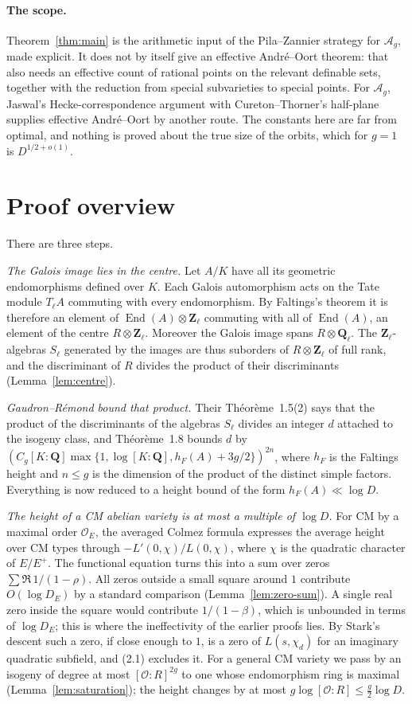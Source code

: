 \documentclass[11pt,a4paper]{article}
\theoremstyle{plain}
\theoremstyle{remark}
\newcommand{\Q}{\mathbf Q}
\newcommand{\Z}{\mathbf Z}
\newcommand{\Ag}{\mathcal A_g}
\newcommand{\OO}{\mathcal O}
\newcommand{\End}{\operatorname{End}}
\begin{document}
\paragraph{The scope.}
Theorem~\ref{thm:main} is the arithmetic input of the Pila--Zannier strategy for $\Ag$, made explicit. It does not
by itself give an effective Andr\'e--Oort theorem: that also needs an effective count of rational points on the
relevant definable sets, together with the reduction from special subvarieties to special points. For $\Ag$, Jaswal's
Hecke-correspondence argument with Cureton--Thorner's half-plane supplies effective Andr\'e--Oort by another route.
The constants here are far from optimal, and nothing is proved about the true size of the orbits, which for $g=1$ is
$D^{1/2+o(1)}$.

\section{Proof overview}

There are three steps.

\emph{The Galois image lies in the centre.} Let $A/K$ have all its geometric endomorphisms defined over $K$. Each
Galois automorphism acts on the Tate module $T_\ell A$ commuting with every endomorphism. By Faltings's theorem it is
therefore an element of $\End(A)\otimes\Z_\ell$ commuting with all of $\End(A)$, an element of the centre
$R\otimes\Z_\ell$. Moreover the Galois image spans $R\otimes\Q_\ell$. The $\Z_\ell$-algebras $S_\ell$ generated by
the images are thus suborders of $R\otimes\Z_\ell$ of full rank, and the discriminant of $R$ divides the product of
their discriminants (Lemma~\ref{lem:centre}).

\emph{Gaudron--R\'emond bound that product.} Their Th\'eor\`eme~1.5(2) says that the product of the discriminants of
the algebras $S_\ell$ divides an integer $d$ attached to the isogeny class, and Th\'eor\`eme~1.8 bounds $d$ by
$(C_g[K:\Q]\max\{1,\log[K:\Q],h_F(A)+3g/2\})^{2n}$, where $h_F$ is the Faltings height and $n\leq g$ is the
dimension of the product of the distinct simple factors. Everything is now reduced to a height bound of the form
$h_F(A)\ll\log D$.

\emph{The height of a CM abelian variety is at most a multiple of $\log D$.} For CM by a maximal order $\OO_E$, the
averaged Colmez formula expresses the average height over CM types through $-L'(0,\chi)/L(0,\chi)$, where $\chi$ is
the quadratic character of $E/E^+$. The functional equation turns this into a sum over zeros
$\sum\Re\,1/(1-\rho)$. All zeros outside a small square around $1$ contribute $O(\log D_E)$ by a standard
comparison (Lemma~\ref{lem:zero-sum}). A single real zero inside the square would contribute $1/(1-\beta)$, which is
unbounded in terms of $\log D_E$; this is where the ineffectivity of the earlier proofs lies. By Stark's descent such
a zero, if close enough to $1$, is a zero of $L(s,\chi_d)$ for an imaginary quadratic subfield, and (2.1) excludes
it. For a general CM variety we pass by an isogeny of degree at most $[\OO:R]^{2g}$ to one whose endomorphism ring
is maximal (Lemma~\ref{lem:saturation}); the height changes by at most $g\log[\OO:R]\leq\tfrac g2\log D$.
\end{document}

